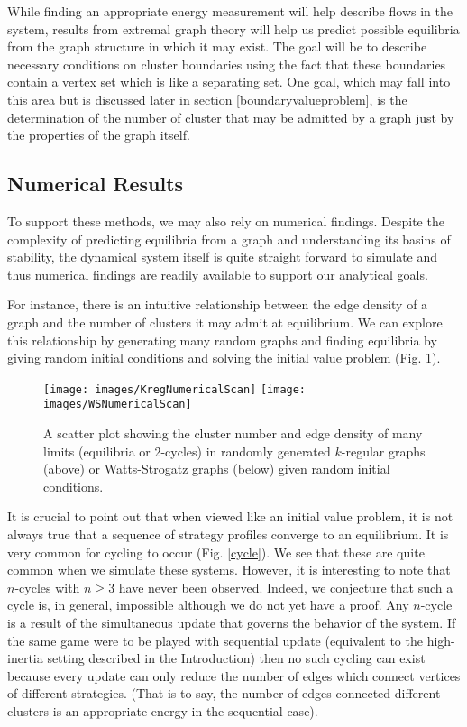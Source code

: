 \documentclass[]{article}
\begin{document}
		While finding an appropriate energy measurement will help describe flows in the system, results from extremal graph theory will help us predict possible equilibria from the graph structure in which it may exist. The goal will be to describe necessary conditions on cluster boundaries using the fact that these boundaries contain a vertex set which is like a separating set\cite{ExtremalGraphTheory}. One goal, which may fall into this area but is discussed later in section \ref{boundaryvalueproblem}, is the determination of the number of cluster that may be admitted by a graph just by the properties of the graph itself. 
		\subsection{Numerical Results}\label{numericalresults}
		To support these methods, we may also rely on numerical findings. Despite the complexity of predicting equilibria from a graph and understanding its basins of stability, the dynamical system itself is quite straight forward to simulate and thus numerical findings are readily available to support our analytical goals. 
		
		For instance, there is an intuitive relationship between the edge density of a graph and the number of clusters it may admit at equilibrium. We can explore this relationship by generating many random graphs and finding equilibria by giving random initial conditions and solving the initial value problem (Fig. \ref{NumericalScan}). 
		\begin{figure}
			\texttt{[image: images/KregNumericalScan]}
			\texttt{[image: images/WSNumericalScan]}
			\caption{A scatter plot showing the cluster number and edge density of many limits (equilibria or 2-cycles) in randomly generated $k$-regular graphs (above) or Watts-Strogatz graphs (below) given random initial conditions.}
			\label{NumericalScan}
		\end{figure}
		
		
		It is crucial to point out that when viewed like an initial value problem, it is not always true that a sequence of strategy profiles converge to an equilibrium. It is very common for cycling to occur (Fig. \ref{cycle}). We see that these are quite common when we simulate these systems. However, it is interesting to note that $n$-cycles with $n\geq 3$ have never been observed. Indeed, we conjecture that such a cycle is, in general, impossible although we do not yet have a proof. Any $n$-cycle is a result of the simultaneous update that governs the behavior of the system. If the same game were to be played with sequential update (equivalent to the high-inertia setting described in the Introduction) then no such cycling can exist because every update can only reduce the number of edges which connect vertices of different strategies. (That is to say, the number of edges connected different clusters is an appropriate energy in the sequential case).
		
\end{document}
